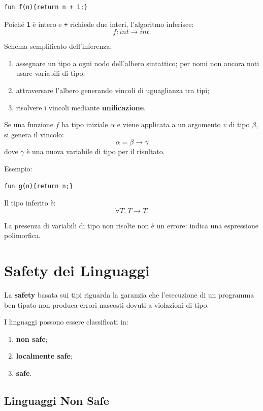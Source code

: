 \documentclass{article}
\begin{document}
\begin{lstlisting}
fun f(n){return n + 1;}
\end{lstlisting}

Poiché \texttt{1} è intero e \texttt{+} richiede due interi, l'algoritmo inferisce:
\[
f : int \to int.
\]

Schema semplificato dell'inferenza:
\begin{enumerate}
  \item assegnare un tipo a ogni nodo dell'albero sintattico; per nomi non ancora noti usare variabili di tipo;
  \item attraversare l'albero generando vincoli di uguaglianza tra tipi;
  \item risolvere i vincoli mediante \textbf{unificazione}.
\end{enumerate}

Se una funzione $f$ ha tipo iniziale $\alpha$ e viene applicata a un argomento $v$ di tipo $\beta$, si genera il vincolo:
\[
\alpha = \beta \to \gamma
\]
dove $\gamma$ è una nuova variabile di tipo per il risultato.

Esempio:

\begin{lstlisting}
fun g(n){return n;}
\end{lstlisting}

Il tipo inferito è:
\[
\forall T.\ T \to T.
\]

La presenza di variabili di tipo non risolte non è un errore: indica una espressione polimorfica.

\section{Safety dei Linguaggi}

La \textbf{safety} basata sui tipi riguarda la garanzia che l'esecuzione di un programma ben tipato non produca errori nascosti dovuti a violazioni di tipo.

I linguaggi possono essere classificati in:
\begin{enumerate}
  \item \textbf{non safe};
  \item \textbf{localmente safe};
  \item \textbf{safe}.
\end{enumerate}

\subsection{Linguaggi Non Safe}
\end{document}
